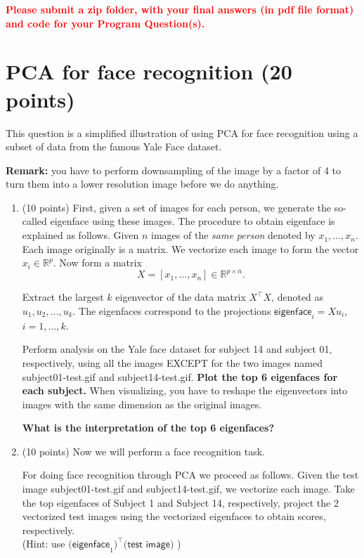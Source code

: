\documentclass[a4paper,12pt,fleqn]{article}
\begin{document}
\textcolor{red}{\bf Please submit a zip folder, with your final answers (in pdf file format) and code for your Program Question(s).}

\section{PCA for face recognition (20 points)}

This question is a simplified illustration of using PCA for face recognition using a subset of data from the famous Yale Face dataset. 

 {\bf Remark:} you have to perform downsampling of the image by a factor of 4 to turn them into a lower resolution image before we do anything. 


\begin{enumerate}
\item 
(10 points) 
First, given a set of images for each person, we generate the so-called eigenface using these images. The procedure to obtain eigenface is explained as follows. 
%
Given $n$ images of the {\it same person} denoted by $x_1, \ldots, x_n$. Each image originally is a matrix. We vectorize each image to form the vector $x_i \in \mathbb R^p$. Now form a matrix
\[
X = [x_1, \ldots, x_n] \in \mathbb R^{p\times n}.
\]

Extract the largest $k$ eigenvector of the data matrix $X^\top X$, denoted as $u_1, u_2,  \ldots, u_k$. The eigenfaces correspond to the projections $\textsf{eigenface}_i = X u_i$, $i = 1, \ldots, k$.

Perform analysis on the Yale face dataset for subject 14 and subject 01, respectively, using all the images EXCEPT for the two images named \textsf{subject01-test.gif} and \textsf{subject14-test.gif}. {\bf Plot the top 6 eigenfaces for each subject.} When visualizing, you have to reshape the eigenvectors into images with the same dimension as the original images. 

{\bf What is the interpretation of the top 6 eigenfaces?}

\item (10 points) Now we will perform a face recognition task. 

For doing face recognition through PCA we proceed as follows. Given the test image \textsf{subject01-test.gif} and \textsf{subject14-test.gif}, we vectorize each image. Take the top eigenfaces of Subject 1 and Subject 14, respectively, project the 2 vectorized test images using the vectorized eigenfaces to obtain scores, respectively. \\(Hint: use $\textsf{(eigenface}_1)^\top \textsf{(test image)}$ )


\end{enumerate}
\end{document}
